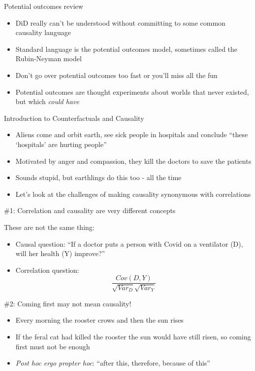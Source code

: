 \documentclass{beamer}
\begin{document}
\begin{frame}{Potential outcomes review}

\begin{itemize}
\item DiD really can't be understood without committing to some common causality language
\item Standard language is the potential outcomes model, sometimes called the Rubin-Neyman model
\item Don't go over potential outcomes too fast or you'll miss all the fun
\item Potential outcomes are thought experiments about worlds that never existed, but which \emph{could have}
\end{itemize}

\end{frame}

\begin{frame}{Introduction to Counterfactuals and Causality}
	
	\begin{itemize}
	\item Aliens come and orbit earth, see sick people in hospitals and conclude ``these `hospitals' are hurting people'' 
	\item Motivated by anger and compassion, they kill the doctors to save the patients
	\item Sounds stupid, but earthlings do this too - all the time
	\item Let's look at the challenges of making causality synonymous with correlations
	\end{itemize}		
		
\end{frame}

\begin{frame}{\#1: Correlation and causality are very different concepts}

These are not the same thing:

		\begin{itemize}
	\item Causal question: ``If a doctor puts a person with Covid on a ventilator (D), will her health (Y) improve?''
	\item Correlation question:  $$\frac{Cov(D,Y)}{\sqrt{Var_D}\sqrt{{Var_Y}}}$$
		\end{itemize}

\end{frame}


\begin{frame}{\#2: Coming first may not mean causality!}

\begin{itemize}
\item Every morning the rooster crows and then the sun rises
\item If the feral cat had killed the rooster the sun would have still risen, so coming first must not be enough
\item \emph{Post hoc ergo propter hoc}: ``after this, therefore, because of this''
\end{itemize}

\end{frame}
\end{document}
